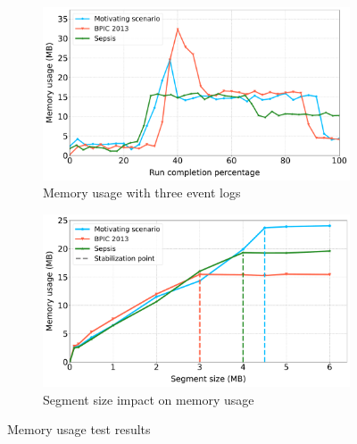 \begin{figure}[t]
\begin{subfigure}{0.49\textwidth}   
  \centering      
  \includegraphics[width=\textwidth]{content/figures/memoryusage3-2.pdf}
  \caption{Memory usage with three event logs}
  \label{snr_c}
\end{subfigure}
\begin{subfigure}{0.49\textwidth}   
  \centering
  \includegraphics[width=\textwidth]{content/figures/memoryusage4-2.pdf}
  \caption{Segment size impact on memory usage}
  \label{snr_d}
\end{subfigure}
\caption{Memory usage test results}
\label{fig:memtest}
\end{figure}

